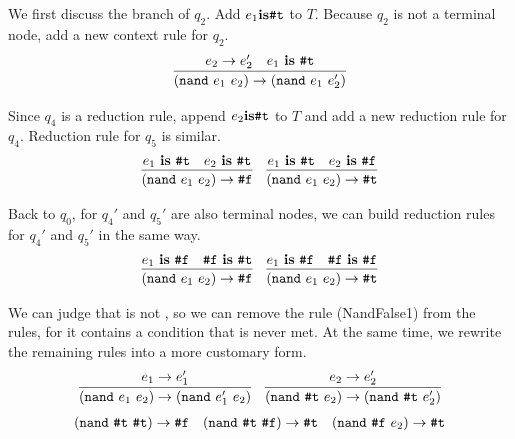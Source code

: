 We first discuss the branch of $q_2$. Add $e_1 \mbox{\rm \bf is} \mbox{\tt \#t}$ to $T$. Because $q_2$ is not a terminal node, add a new context rule for $q_2$.
\[
\infer{(\m{nand}~e_1~e_2) \to (\m{nand}~e_1~e_2')}{e_2 \to e_2'\quad e_1~\key{is}~\m{\#t}}
\]

Since $q_4$ is a reduction rule, append $e_2 \mbox{\rm \bf is} \mbox{\tt \#t}$ to $T$ and add a new reduction rule for $q_4$. Reduction rule for $q_5$ is similar.
\[
\begin{array}{c}
\infer{(\m{nand}~e_1~e_2) \to \m{\#f}}{e_1~\key{is}~\m{\#t}\quad e_2~\key{is}~\m{\#t}}
\quad
\infer{(\m{nand}~e_1~e_2) \to \m{\#t}}{e_1~\key{is}~\m{\#t}\quad e_2~\key{is}~\m{\#f}}
\end{array}
\]

Back to $q_0$, for $q_4'$ and $q_5'$ are also terminal nodes, we can build reduction rules for $q_4'$ and $q_5'$ in the same way.
\[
\begin{array}{c}
\infer{(\m{nand}~e_1~e_2) \to \m{\#f}}{e_1~\key{is}~\m{\#f}\quad \m{\#f}~\key{is}~\m{\#t}}
\quad
\infer{(\m{nand}~e_1~e_2) \to \m{\#t}}{e_1~\key{is}~\m{\#f}\quad \m{\#f}~\key{is}~\m{\#f}}
\end{array}
\]

We can judge that  is not , so we can remove the rule (NandFalse1) from the rules, for it contains a condition that is never met. At the same time, we rewrite the remaining rules into a more customary form.
\[
\begin{array}{cc}
\infer{(\m{nand}~e_1~e_2) \to (\m{nand}~e_1'~e_2)}{e_1 \to e_1'}
&
\infer{(\m{nand}~\m{\#t}~e_2) \to (\m{nand}~\m{\#t}~e_2')}{e_2 \to e_2'}
\end{array}
\]\[
\begin{array}{ccc}
(\mbox{\tt nand}~\mbox{\tt \#t}~\mbox{\tt \#t}) \to \mbox{\tt \#f}
&
(\mbox{\tt nand}~\mbox{\tt \#t}~\mbox{\tt \#f}) \to \mbox{\tt \#t}
&
(\mbox{\tt nand}~\mbox{\tt \#f}~e_2) \to \mbox{\tt \#t}
\end{array}
\]



